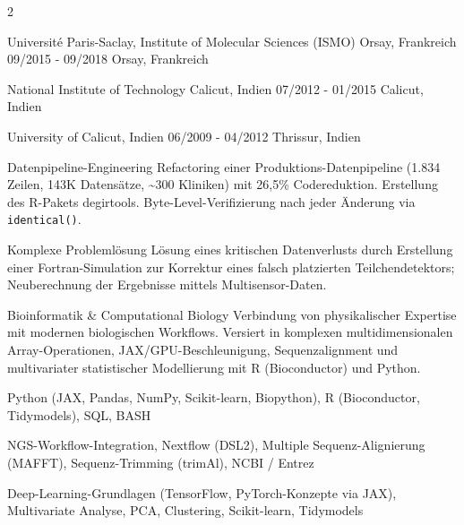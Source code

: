 \documentclass{thejus_cv}
\begin{document}
\begin{paracol}{2}

             {Universit\'e Paris-Saclay, Institute of Molecular Sciences (ISMO) Orsay, Frankreich}
             {09/2015 - 09/2018}
             {Orsay, Frankreich}
             {}

             {National Institute of Technology Calicut, Indien}
             {07/2012 - 01/2015}
             {Calicut, Indien}
             {}

             {University of Calicut, Indien}
             {06/2009 - 04/2012}
             {Thrissur, Indien}
             {}


\switchcolumn



\cvstrength{\faStar}
           {Datenpipeline-Engineering}
           {Refactoring einer Produktions-Datenpipeline (1.834 Zeilen, 143K Datens\"atze, \textasciitilde300 Kliniken) mit 26,5\% Codereduktion. Erstellung des R-Pakets degirtools. Byte-Level-Verifizierung nach jeder \"Anderung via \texttt{identical()}.}

\cvstrength{\faLightbulb}
           {Komplexe Probleml\"osung}
           {L\"osung eines kritischen Datenverlusts durch Erstellung einer Fortran-Simulation zur Korrektur eines falsch platzierten Teilchendetektors; Neuberechnung der Ergebnisse mittels Multisensor-Daten.}

\cvstrength{\faAward}
           {Bioinformatik \& Computational Biology}
           {Verbindung von physikalischer Expertise mit modernen biologischen Workflows. Versiert in komplexen multidimensionalen Array-Operationen, JAX/GPU-Beschleunigung, Sequenzalignment und multivariater statistischer Modellierung mit R (Bioconductor) und Python.}


         {Python (JAX, Pandas, NumPy, Scikit-learn, Biopython), R (Bioconductor, Tidymodels), SQL, BASH}

         {NGS-Workflow-Integration, Nextflow (DSL2), Multiple Sequenz-Alignierung (MAFFT), Sequenz-Trimming (trimAl), NCBI / Entrez}

         {Deep-Learning-Grundlagen (TensorFlow, PyTorch-Konzepte via JAX), Multivariate Analyse, PCA, Clustering, Scikit-learn, Tidymodels}


\end{paracol}
\end{document}
